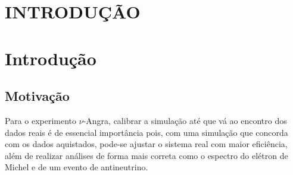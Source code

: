 \chapter{INTRODUÇÃO} \label{cap:intro}
\vspace{-2cm}
\chapter{Introdução} \label{cap:motivacao}
\vspace{-2cm}

\section{Motivação} \label{cap:motivacao}

Para o experimento $\nu$-Angra, calibrar a simulação até que vá ao encontro dos dados reais é de essencial importância pois, com uma simulação que concorda com os dados aquistados, pode-se ajustar o sistema real com maior eficiência, além de realizar análises de forma mais correta como o espectro do elétron de Michel e de um evento de antineutrino. 

